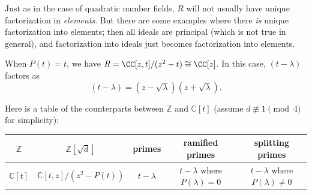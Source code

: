 Just as in the case of quadratic number fields, $R$ will not usually have unique factorization in \emph{elements}. But there are some examples where there \emph{is} unique factorization into elements; then all ideals are principal (which is not true in general), and factorization into ideals just becomes factorization into elements. 

\begin{example}
    When $P(t) = t$, we have $R = \CC[z, t]/(z^2 - t) \cong \CC[z]$. In this case, $(t - \lambda)$ factors as \[(t - \lambda) = (z - \sqrt{\lambda})(z + \sqrt{\lambda}).\] 
\end{example}






Here is a table of the counterparts between $\mathbb{Z}$ and $\mathbb{C}[t]$ (assume $d \not\equiv 1 \pmod{4}$ for simplicity):
\begin{center}
    \begin{tabular}{c|c|c|c|c}
        $\mathbb{Z}$ & $\mathbb{Z}[\sqrt{d}]$ & primes & ramified primes & splitting primes \\
        \hline
        $\mathbb{C}[t]$ & $\mathbb{C}[t, z]/(z^2 - P(t))$ & $t - \lambda$ & $t - \lambda$ where $P(\lambda) = 0$ & $t - \lambda$ where $P(\lambda) \neq 0$
    \end{tabular}
\end{center}

